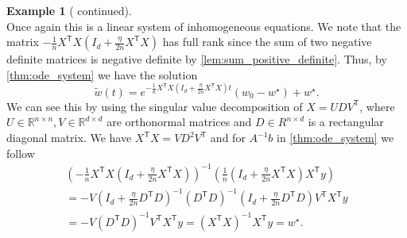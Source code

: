 \documentclass[12pt]{article}
\theoremstyle{definition}
\newtheorem{example}[example]{Example}
\numberwithin{equation}{section}
\newcommand{\R}{\mathbb{R}}
\newcommand{\T}{\mathsf{T}}
\begin{document}
\begin{example}[ continued]
\begin{equation*}
  \end{equation*}
  Once again this is a linear system of inhomogeneous equations. We note that the matrix $-\frac{1}{n}X^\T X \left(I_d + \frac{\eta}{2n}X^\T X\right)$ has full rank since the sum of two negative definite matrices is negative definite by \autoref{lem:sum_positive_definite}. 
  Thus, by \autoref{thm:ode_system} we have the solution
  \begin{equation}
    \label{eq:linear_regression_second_order}
    \widetilde{w}(t) = e^{-\frac{1}{n}X^\T X \left(I_d + \frac{\eta}{2n}X^\T X\right)t}(w_0 - w^\star) + w^\star.
  \end{equation}
  We can see this by using the singular value decomposition of $X = U D V^\T$, where $U \in \R^{n \times n},V \in \R^{d \times d}$ are orthonormal matrices and $D \in R^{n \times d}$ is a rectangular diagonal matrix. We have $X^\T X = V D^2 V^\T$ and for $A^{-1}b$ in \autoref{thm:ode_system} we follow
  \begin{align*}
    \left(-\frac{1}{n}X^\T X \left(I_d + \frac{\eta}{2n}X^\T X\right)\right)^{-1}\left(\frac{1}{n}\left(I_d + \frac{\eta}{2n} X^\T X\right)X^\T y\right) \\
    =- V\left(I_d + \frac{\eta}{2n}D^\T D\right)^{-1}(D^\T D)^{-1}\left(I_d + \frac{\eta}{2n}D^\T D\right)V^\T X^\T y \\
    = -V (D^\T D)^{-1} V^\T X^\T y = (X^\T X)^{-1} X^\T y = w^\star.
  \end{align*}


\end{example}
\end{document}
